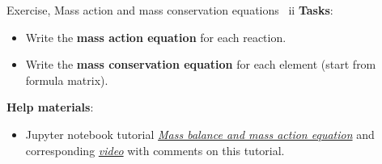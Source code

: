 %
\begin{frame}{Exercise, Mass action and mass conservation equations \, ii}
\textbf{Tasks}:
\begin{itemize}
\item Write the \textbf{mass action equation }for each reaction.
\item Write the \textbf{mass conservation equation }for each element (start from formula matrix).
\end{itemize}
\pause
\textbf{Help materials}: 
\begin{itemize}
\item Jupyter notebook tutorial \href{https://github.com/mtsveta/reaktoro-jupyter/blob/geofluids-examples/tutorial/eq.mass-balance-mass-action.ipynb}{\textcolor{indigo(dye)}{\it Mass balance and mass action equation}} and corresponding  
\href{https://polybox.ethz.ch/index.php/s/qStBnxUnry648U5}{\textcolor{indigo(dye)}{\it video}} with comments on this tutorial.
\end{itemize}
\end{frame}
%
%
%
